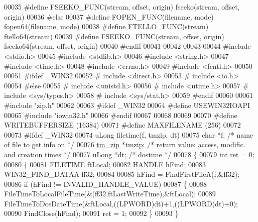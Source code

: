 \begin{DoxyCode}
00035 \textcolor{preprocessor}{#define FSEEKO\_FUNC(stream, offset, origin) fseeko(stream, offset, origin)}
00036 \textcolor{preprocessor}{#else}
00037 \textcolor{preprocessor}{#define FOPEN\_FUNC(filename, mode) fopen64(filename, mode)}
00038 \textcolor{preprocessor}{#define FTELLO\_FUNC(stream) ftello64(stream)}
00039 \textcolor{preprocessor}{#define FSEEKO\_FUNC(stream, offset, origin) fseeko64(stream, offset, origin)}
00040 \textcolor{preprocessor}{#endif}
00041 
00042 
00043 
00044 \textcolor{preprocessor}{#include <stdio.h>}
00045 \textcolor{preprocessor}{#include <stdlib.h>}
00046 \textcolor{preprocessor}{#include <string.h>}
00047 \textcolor{preprocessor}{#include <time.h>}
00048 \textcolor{preprocessor}{#include <errno.h>}
00049 \textcolor{preprocessor}{#include <fcntl.h>}
00050 
00051 \textcolor{preprocessor}{#ifdef \_WIN32}
00052 \textcolor{preprocessor}{# include <direct.h>}
00053 \textcolor{preprocessor}{# include <io.h>}
00054 \textcolor{preprocessor}{#else}
00055 \textcolor{preprocessor}{# include <unistd.h>}
00056 \textcolor{preprocessor}{# include <utime.h>}
00057 \textcolor{preprocessor}{# include <sys/types.h>}
00058 \textcolor{preprocessor}{# include <sys/stat.h>}
00059 \textcolor{preprocessor}{#endif}
00060 
00061 \textcolor{preprocessor}{#include "zip.h"}
00062 
00063 \textcolor{preprocessor}{#ifdef \_WIN32}
00064 \textcolor{preprocessor}{        #define USEWIN32IOAPI}
00065 \textcolor{preprocessor}{        #include "iowin32.h"}
00066 \textcolor{preprocessor}{#endif}
00067 
00068 
00069 
00070 \textcolor{preprocessor}{#define WRITEBUFFERSIZE (16384)}
00071 \textcolor{preprocessor}{#define MAXFILENAME (256)}
00072 
00073 \textcolor{preprocessor}{#ifdef \_WIN32}
00074 uLong filetime(f, tmzip, dt)
00075     \textcolor{keywordtype}{char} *f;                \textcolor{comment}{/* name of file to get info on */}
00076     \hyperlink{structtm__zip__s}{tm\_zip} *tmzip;             \textcolor{comment}{/* return value: access, modific. and creation times */}
00077     uLong *dt;             \textcolor{comment}{/* dostime */}
00078 \{
00079   \textcolor{keywordtype}{int} ret = 0;
00080   \{
00081       FILETIME ftLocal;
00082       HANDLE hFind;
00083       WIN32\_FIND\_DATAA ff32;
00084 
00085       hFind = FindFirstFileA(f,&ff32);
00086       \textcolor{keywordflow}{if} (hFind != INVALID\_HANDLE\_VALUE)
00087       \{
00088         FileTimeToLocalFileTime(&(ff32.ftLastWriteTime),&ftLocal);
00089         FileTimeToDosDateTime(&ftLocal,((LPWORD)dt)+1,((LPWORD)dt)+0);
00090         FindClose(hFind);
00091         ret = 1;
00092       \}
00093   \}

\end{DoxyCode}
